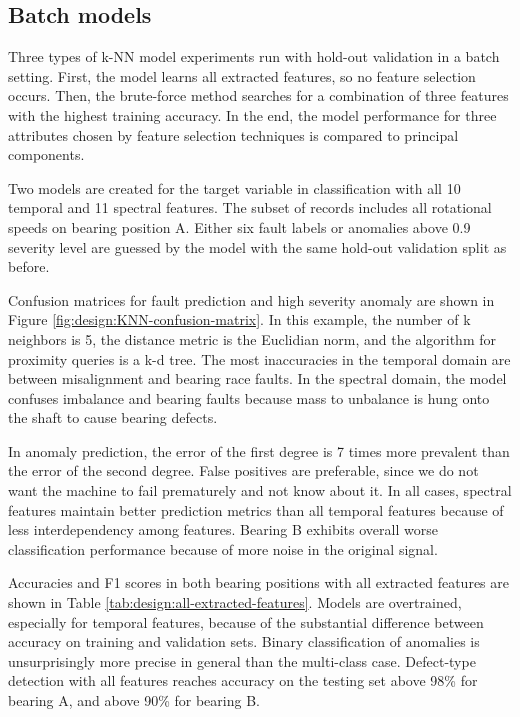 \subsection{Batch models}
Three types of k-NN model experiments run with hold-out validation in a batch setting. First, the model learns all extracted features, so no feature selection occurs. Then, the brute-force method searches for a combination of three features with the highest training accuracy. In the end, the model performance for three attributes chosen by feature selection techniques is compared to principal components.


Two models are created for the target variable in classification with all 10 temporal and 11 spectral features. The subset of records includes all rotational speeds on bearing position A. Either six fault labels or anomalies above 0.9 severity level are guessed by the model with the same hold-out validation split as before. 

Confusion matrices for fault prediction and high severity anomaly are shown in Figure \ref{fig:design:KNN-confusion-matrix}. In this example, the number of k neighbors is 5, the distance metric is the Euclidian norm, and the algorithm for proximity queries is a k-d tree. The most inaccuracies in the temporal domain are between misalignment and bearing race faults. In the spectral domain, the model confuses imbalance and bearing faults because mass to unbalance is hung onto the shaft to cause bearing defects. 

In anomaly prediction, the error of the first degree is 7 times more prevalent than the error of the second degree. False positives are preferable, since we do not want the machine to fail prematurely and not know about it. In all cases, spectral features maintain better prediction metrics than all temporal features because of less interdependency among features. Bearing B exhibits overall worse classification performance because of more noise in the original signal.

%

Accuracies and F1 scores in both bearing positions with all extracted features are shown in Table \ref{tab:design:all-extracted-features}. Models are overtrained, especially for temporal features, because of the substantial difference between accuracy on training and validation sets. Binary classification of anomalies is unsurprisingly more precise in general than the multi-class case. Defect-type detection with all features reaches accuracy on the testing set above 98\% for bearing A, and above 90\% for bearing B.

